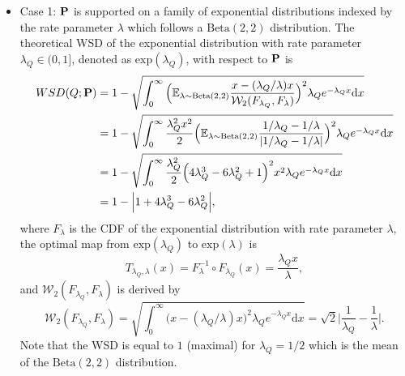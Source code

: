\documentclass{imsart}
\numberwithin{equation}{section}
\begin{document}
\begin{itemize}
	\item Case 1: ${\bf P}$ is supported on a family of exponential distributions indexed by the rate parameter $\lambda$ which follows a $\mathrm{Beta}(2,2)$ distribution. The theoretical WSD of the exponential distribution with rate parameter $\lambda_Q \in (0,1]$, denoted as $\mathrm{exp}(\lambda_Q)$, with respect to ${\bf P}$ is
	\begin{align*}
		{\rm WSD}(Q; {\bf P}) &= 1- \sqrt{ \int_0^\infty \Big( \mathbb{E}_{\lambda\sim \mathrm{Beta}(2,2)} \frac{x-(\lambda_Q/\lambda)x}{\mathcal{W}_2(F_{\lambda_Q}, F_\lambda)}  \Big)^2 \lambda_Q e^{-\lambda_Q x} \mathrm{d} x}\\
		&= 1- \sqrt{ \int_0^\infty \frac{\lambda_Q^2 x^2}{2} \Big( \mathbb{E}_{\lambda\sim \mathrm{Beta}(2,2)} \frac{1/\lambda_Q - 1/\lambda}{|1/\lambda_Q - 1/\lambda|} \Big)^2 \lambda_Q e^{-\lambda_Q x} \mathrm{d} x}\\
		&= 1- \sqrt{ \int_0^\infty \frac{\lambda_Q^2}{2} \Big( 4\lambda_Q^3 -6\lambda_Q^2 +1 \Big)^2 x^2 \lambda_Q e^{-\lambda_Q x} \mathrm{d}x}\\
		&= 1- \Big| 1+4\lambda_Q^3 - 6\lambda_Q^2 \Big| ,
	\end{align*}
	where $F_\lambda$ is the CDF of the exponential distribution with rate parameter $\lambda$, the optimal map from $\mathrm{exp}(\lambda_Q)$ to $\mathrm{exp}(\lambda)$ is 
	\begin{equation*}
		T_{\lambda_Q, \lambda} (x) = F_\lambda^{-1} \circ F_{\lambda_Q}(x) = \frac{\lambda_Q x}{\lambda} ,
	\end{equation*}
	and $\mathcal{W}_2(F_{\lambda_Q}, F_\lambda)$ is derived by
	\begin{equation*}
		\mathcal{W}_2(F_{\lambda_Q}, F_\lambda) = \sqrt{\int_0^\infty \Big(x-(\lambda_Q/\lambda)x \Big)^2 \lambda_Q e^{-\lambda_Q x} \mathrm{d}x} = \sqrt{2}\Big| \frac{1}{\lambda_Q}-\frac{1}{\lambda} \Big| .
	\end{equation*}
	Note that the WSD is equal to $1$ (maximal) for $\lambda_Q = 1/2$ which is the mean of the $\mathrm{Beta}(2,2)$ distribution.
	

\end{itemize}
\end{document}
